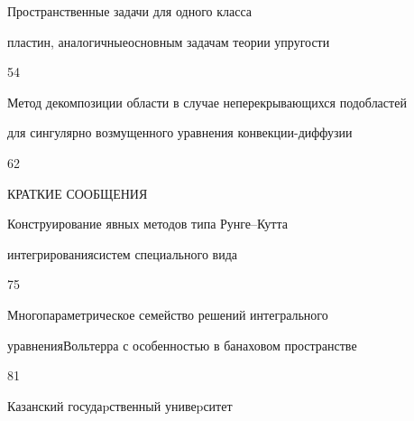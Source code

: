 {Пространственные задачи для одного класса


пластин, аналогичные\newline основным задачам теории упругости}{54}




{Метод декомпозиции области в случае неперекрывающихся подобластей\newline


для сингулярно возмущенного уравнения конвекции-диффузии}{62}





\bigskip





\begin{center}


КРАТКИЕ СООБЩЕНИЯ


\end{center}


\bigskip









{Конструирование явных методов типа Рунге--Кутта


интегрирования\newline систем специального вида}{75}




{Многопараметрическое семейство решений интегрального


уравнения\newline Вольтерра с особенностью в банаховом пространстве}{81}














\vfill


\noindent\raisebox{2pt}{\copyright} Казанский госудаpственный унивеpситет





